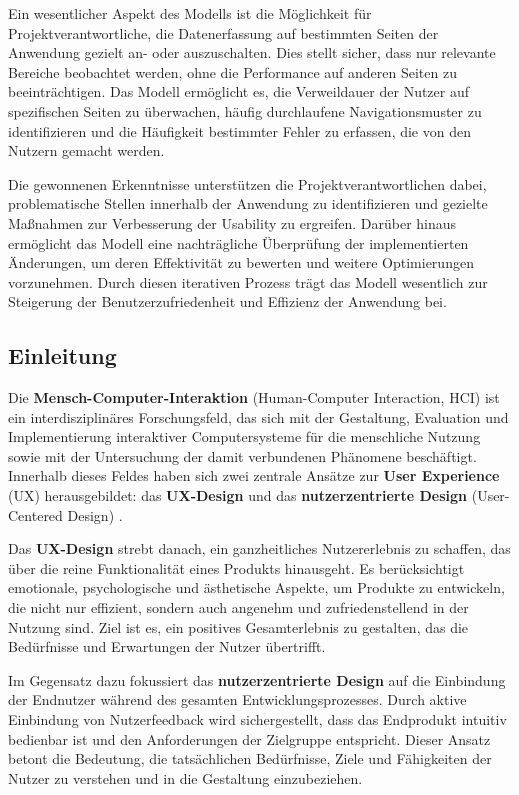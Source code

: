 \documentclass[12pt,oneside]{article}
\begin{document}
Ein wesentlicher Aspekt des Modells ist die Möglichkeit für Projektverantwortliche, die Datenerfassung auf bestimmten Seiten der Anwendung gezielt an- oder auszuschalten. Dies stellt sicher, dass nur relevante Bereiche beobachtet werden, ohne die Performance auf anderen Seiten zu beeinträchtigen. Das Modell ermöglicht es, die Verweildauer der Nutzer auf spezifischen Seiten zu überwachen, häufig durchlaufene Navigationsmuster zu identifizieren und die Häufigkeit bestimmter Fehler zu erfassen, die von den Nutzern gemacht werden.

Die gewonnenen Erkenntnisse unterstützen die Projektverantwortlichen dabei, problematische Stellen innerhalb der Anwendung zu identifizieren und gezielte Maßnahmen zur Verbesserung der Usability zu ergreifen. Darüber hinaus ermöglicht das Modell eine nachträgliche Überprüfung der implementierten Änderungen, um deren Effektivität zu bewerten und weitere Optimierungen vorzunehmen. Durch diesen iterativen Prozess trägt das Modell wesentlich zur Steigerung der Benutzerzufriedenheit und Effizienz der Anwendung bei.

\subsection{Einleitung}

Die \textbf{Mensch-Computer-Interaktion} (Human-Computer Interaction, HCI) ist ein interdisziplinäres Forschungsfeld, das sich mit der Gestaltung, Evaluation und Implementierung interaktiver Computersysteme für die menschliche Nutzung sowie mit der Untersuchung der damit verbundenen Phänomene beschäftigt. Innerhalb dieses Feldes haben sich zwei zentrale Ansätze zur \textbf{User Experience} (UX) herausgebildet: das \textbf{UX-Design} und das \textbf{nutzerzentrierte Design} (User-Centered Design) \cite{glanznig}.

Das \textbf{UX-Design} strebt danach, ein ganzheitliches Nutzererlebnis zu schaffen, das über die reine Funktionalität eines Produkts hinausgeht. Es berücksichtigt emotionale, psychologische und ästhetische Aspekte, um Produkte zu entwickeln, die nicht nur effizient, sondern auch angenehm und zufriedenstellend in der Nutzung sind. Ziel ist es, ein positives Gesamterlebnis zu gestalten, das die Bedürfnisse und Erwartungen der Nutzer übertrifft.

Im Gegensatz dazu fokussiert das \textbf{nutzerzentrierte Design} auf die Einbindung der Endnutzer während des gesamten Entwicklungsprozesses. Durch aktive Einbindung von Nutzerfeedback wird sichergestellt, dass das Endprodukt intuitiv bedienbar ist und den Anforderungen der Zielgruppe entspricht. Dieser Ansatz betont die Bedeutung, die tatsächlichen Bedürfnisse, Ziele und Fähigkeiten der Nutzer zu verstehen und in die Gestaltung einzubeziehen.
\end{document}
